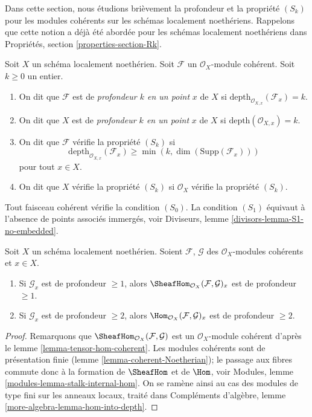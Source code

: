 \noindent
Dans cette section, nous étudions brièvement la profondeur et la propriété
$(S_k)$ pour les modules cohérents sur les schémas localement
noethériens. Rappelons que cette notion a déjà été abordée pour les
schémas localement noethériens dans Propriétés, section \ref{properties-section-Rk}.

\begin{definition}
\label{definition-depth}
Soit $X$ un schéma localement noethérien.
Soit $\mathcal{F}$ un $\mathcal{O}_X$-module cohérent.
Soit $k \geq 0$ un entier.
\begin{enumerate}
\item On dit que $\mathcal{F}$ est de {\it profondeur $k$ en un point}
$x$ de $X$ si $\text{depth}_{\mathcal{O}_{X, x}}(\mathcal{F}_x) = k$.
\item On dit que $X$ est de {\it profondeur $k$ en un point} $x$ de $X$ si
$\text{depth}(\mathcal{O}_{X, x}) = k$.
\item On dit que $\mathcal{F}$ vérifie la propriété {\it $(S_k)$} si
$$
\text{depth}_{\mathcal{O}_{X, x}}(\mathcal{F}_x)
\geq \min(k, \dim(\text{Supp}(\mathcal{F}_x)))
$$
pour tout $x \in X$.
\item On dit que $X$ vérifie la propriété {\it $(S_k)$} si $\mathcal{O}_X$ vérifie la
propriété $(S_k)$.
\end{enumerate}
\end{definition}

\noindent
Tout faisceau cohérent vérifie la condition $(S_0)$. La
condition $(S_1)$ équivaut à l'absence de points associés
immergés, voir Diviseurs, lemme \ref{divisors-lemma-S1-no-embedded}.

\begin{lemma}
\label{lemma-hom-into-depth}
Soit $X$ un schéma localement noethérien. Soient $\mathcal{F}$, $\mathcal{G}$
des $\mathcal{O}_X$-modules cohérents et $x \in X$.
\begin{enumerate}
\item Si $\mathcal{G}_x$ est de profondeur $\geq 1$, alors
$\SheafHom_{\mathcal{O}_X}(\mathcal{F}, \mathcal{G})_x$
est de profondeur $\geq 1$.
\item Si $\mathcal{G}_x$ est de profondeur $\geq 2$, alors
$\Hom_{\mathcal{O}_X}(\mathcal{F}, \mathcal{G})_x$ est de profondeur $\geq 2$.
\end{enumerate}
\end{lemma}

\begin{proof}
Remarquons que $\SheafHom_{\mathcal{O}_X}(\mathcal{F}, \mathcal{G})$ est
un $\mathcal{O}_X$-module cohérent d'après le lemme \ref{lemma-tensor-hom-coherent}.
Les modules cohérents sont de présentation finie
(lemme \ref{lemma-coherent-Noetherian}); le passage aux fibres commute donc à
la formation de $\SheafHom$ et de $\Hom$, voir
Modules, lemme \ref{modules-lemma-stalk-internal-hom}.
On se ramène ainsi au cas des modules de type fini sur
les anneaux locaux, traité dans Compléments d'algèbre, lemme \ref{more-algebra-lemma-hom-into-depth}.
\end{proof}

